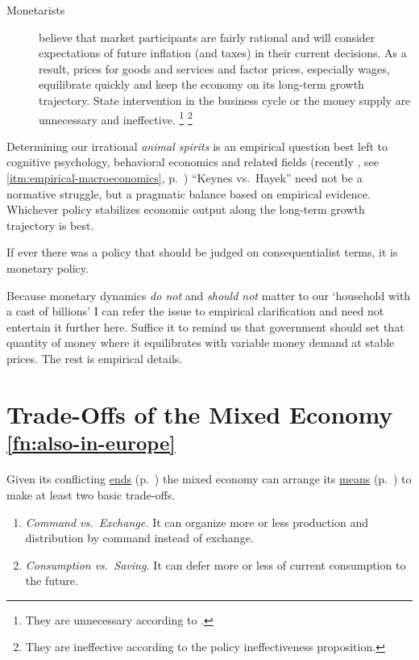 \begin{enumerate}
\begin{description}
		\item[Monetarists]
		believe that market participants are fairly rational and will consider expectations of future inflation (and taxes) in their current decisions.
		As a result, prices for goods and services and factor prices, especially wages, equilibrate quickly and keep the economy on its long-term growth trajectory.
		State intervention in the business cycle or the money supply are unnecessary and ineffective.
		\footnote{
			They are unnecessary according to .
		}
		\footnote{
			They are ineffective according to the policy ineffectiveness proposition.
		}
	\end{description}

	Determining our irrational \emph{animal spirits} \citep{Keynes1936} is an empirical question best left to cognitive psychology, behavioral economics and related fields (recently \citealt{Akerlof2010}, see \autoref{itm:empirical-macroeconomics}, p.~\pageref{itm:empirical-macroeconomics})
	``Keynes vs.\ Hayek'' \citep{Wapshott2011} need not be a normative struggle, but a pragmatic balance based on empirical evidence.
	Whichever policy stabilizes economic output along the long-term growth trajectory is best.

	If ever there was a policy that should be judged on consequentialist terms, it is monetary policy.
\end{enumerate}

Because monetary dynamics \emph{do not} and \emph{should not} matter to our `household with a cast of billions' I can refer the issue to empirical clarification and need not entertain it further here.
Suffice it to remind us that government should set that quantity of money where it equilibrates with variable money demand at stable prices.
The rest is empirical details.

\section[Trade-Offs]{Trade-Offs of the Mixed Economy \textsuperscript{\ref{fn:also-in-europe}}}
	\label{sec:trade-offs}


Given its conflicting \hyperref[sec:ends]{ends} (p.~\pageref{sec:ends}) the mixed economy can arrange its \hyperref[sec:means]{means} (p.~\pageref{sec:means}) to make at least two basic trade-offs.

\begin{enumerate}
	\item \emph{Command vs.\ Exchange.}
	It can organize more or less production and distribution by command instead of exchange.

	\item \emph{Consumption vs.\ Saving.}
	It can defer more or less of current consumption to the future.
\end{enumerate}

